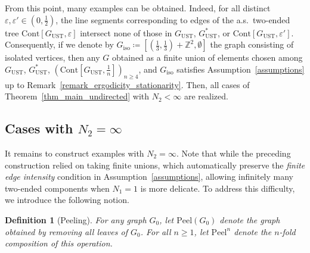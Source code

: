 \documentclass[a4paper, 11pt]{article} %
\theoremstyle{plain}
\newtheorem{definition}[theorem]{Definition}
\newcommand{\Z}{\mathbb{Z}}
\newcommand{\1}{\mathds 1}
\numberwithin{equation}{section}
\begin{document}
From this point, many examples can be obtained. Indeed, for all distinct $\varepsilon,\varepsilon'\in(0,\frac{1}{2})$, the line segments corresponding to edges of the a.s.\ two-ended tree $\mathrm{Cont}[G_\mathrm{UST}, \varepsilon]$ intersect none of those in $G_\mathrm{UST}$, $G_\mathrm{UST}^*$, or $\mathrm{Cont}[G_\mathrm{UST}, \varepsilon']$. Consequently, if we denote by  $G_\mathrm{iso}\coloneqq[ (\tfrac13,\tfrac13)+\Z^2,\emptyset]$ the graph consisting of isolated vertices, then any $G$ obtained as a finite union of elements chosen among $G_\mathrm{UST}$, $G_\mathrm{UST}^*$, $(\mathrm{Cont}[G_\mathrm{UST}, \tfrac{1}{n}])_{n\geq4}$, and $G_\mathrm{iso}$ satisfies Assumption~\ref{assumptions} up to Remark~\ref{remark_ergodicity_stationarity}. Then, all cases of Theorem~\ref{thm_main_undirected} with $N_2<\infty$ are realized.


\subsection*{Cases with $N_2=\infty$}


It remains to construct examples with $N_2=\infty$. Note that while the preceding construction relied on taking finite unions, which automatically preserve the \emph{finite edge intensity} condition in Assumption~\ref{assumptions}, allowing infinitely many two-ended components when $N_1=1$ is more delicate. To address this difficulty, we introduce the following notion.


\begin{definition}[Peeling]
    For any graph $G_0$, let $\mathrm{Peel}(G_0)$ denote the graph obtained by removing all leaves of $G_0$. For all $n\geq 1$, let $\mathrm{Peel}^n$ denote the $n$-fold composition of this operation.
\end{definition}
\end{document}
